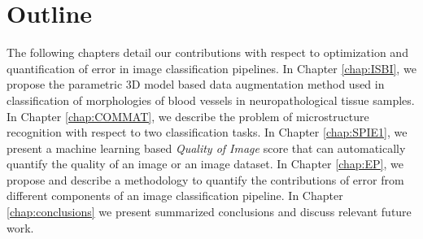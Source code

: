 \section{Outline}
The following chapters detail our contributions with respect to optimization and quantification of error in image classification pipelines.
In Chapter \ref{chap:ISBI}, we propose the parametric 3D model based data augmentation method used in classification of morphologies of blood vessels in neuropathological tissue samples. 
In Chapter \ref{chap:COMMAT}, we describe the problem of microstructure recognition with respect to two classification tasks. 
In Chapter \ref{chap:SPIE1}, we present a machine learning based \textit{Quality of Image} score that can automatically quantify the quality of an image or an image dataset.
In Chapter \ref{chap:EP}, we propose and describe a methodology to quantify the contributions of error from different components of an image classification pipeline. 
In Chapter \ref{chap:conclusions} we present summarized conclusions and discuss relevant future
work. 